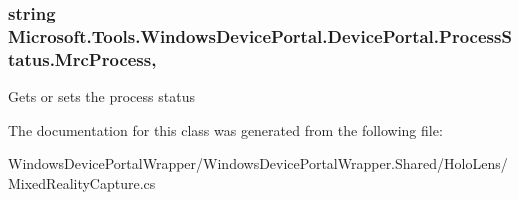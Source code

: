 \subsubsection[{\texorpdfstring{Mrc\+Process}{MrcProcess}}]{\setlength{\rightskip}{0pt plus 5cm}string Microsoft.\+Tools.\+Windows\+Device\+Portal.\+Device\+Portal.\+Process\+Status.\+Mrc\+Process\hspace{0.3cm}{\ttfamily [get]}, {\ttfamily [set]}}\hypertarget{class_microsoft_1_1_tools_1_1_windows_device_portal_1_1_device_portal_1_1_process_status_a657860945aed2462fc2b1faa4696b6bb}{}\label{class_microsoft_1_1_tools_1_1_windows_device_portal_1_1_device_portal_1_1_process_status_a657860945aed2462fc2b1faa4696b6bb}


Gets or sets the process status 



The documentation for this class was generated from the following file\+:\begin{DoxyCompactItemize}
\item 
Windows\+Device\+Portal\+Wrapper/\+Windows\+Device\+Portal\+Wrapper.\+Shared/\+Holo\+Lens/Mixed\+Reality\+Capture.\+cs\end{DoxyCompactItemize}
